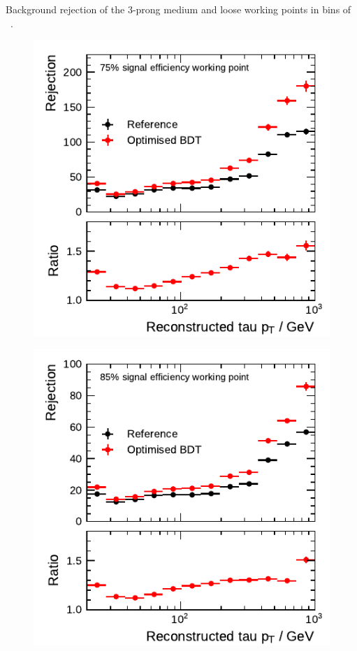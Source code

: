 \begin{minipage}{\textwidth}
\begin{subfigure}{0.48\textwidth}
  \end{subfigure}
  \caption[Background rejection of the 3-prong medium and loose working points
  in bins of \tauhadvis~\pt for the BDT-based identification]{Background
    rejection of the 3-prong medium and loose working points in bins of
    \tauhadvis~\pt.}
\end{minipage}

\noindent
\begin{minipage}{\textwidth}
  \captionsetup{type=figure}
  \begin{subfigure}{0.48\textwidth}
    \centering
    \includegraphics{./figures/bdt_perf/post_optimisation/1p_highpt/rejection_medium_ratio_highpt.pdf}
  \end{subfigure}\hfill
  \begin{subfigure}{0.48\textwidth}
    \centering
    \includegraphics{./figures/bdt_perf/post_optimisation/1p_highpt/rejection_loose_ratio_highpt.pdf}

\end{subfigure}
\end{minipage}
